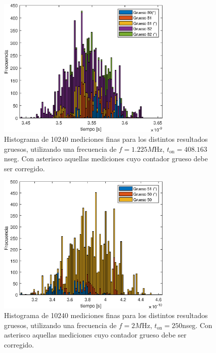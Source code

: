 \begin{figure}[H]
     \centering
     \includegraphics[width=0.75\textwidth]{imagenes/histograma_1_225M.eps}
     \caption{Histograma de 10240 mediciones finas para los distintos resultados gruesos, 
      utilizando una frecuencia de $f=1.225M$Hz, $t_{\text{on}}=408.163$nseg. 
      Con asterisco aquellas mediciones cuyo contador grueso debe ser corregido.}
     \label{fig: histograma_1225M}
\end{figure}

\begin{figure}[H]
     \centering
     \includegraphics[width=0.75\textwidth]{imagenes/histograma_2M.eps}
     \caption{Histograma de 10240 mediciones finas para los distintos resultados gruesos, 
      utilizando una frecuencia de $f=2M$Hz, $t_{\text{on}}=250$nseg. 
      Con asterisco aquellas mediciones cuyo contador grueso debe ser corregido.}
     \label{fig: histograma_2M}
\end{figure}

